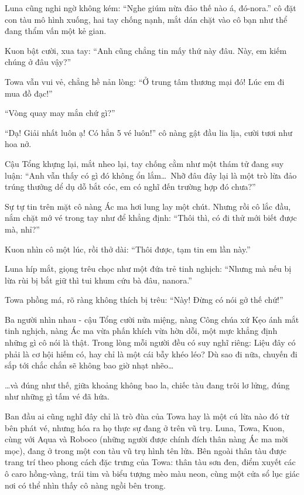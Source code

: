 \documentclass[../main.tex]{subfiles}
\begin{document}
Luna cũng nghi ngờ không kém: ``Nghe giúm nừa đảo thế nào á, đó-nora.'' cô đặt con tàu mô hình xuống, hai tay chống nạnh, mắt dán chặt vào cô bạn như thể đang thẩm vấn một kẻ gian.

Kuon bật cười, xua tay: ``Anh cũng chẳng tin mấy thứ này đâu. Này, em kiếm chúng ở đâu vậy?''

Towa vẫn vui vẻ, chẳng hề nản lòng: ``Ở trung tâm thương mại đó! Lúc em đi mua đồ đạc!''

``Vòng quay may mắn chứ gì?''

``Dạ! Giải nhất luôn ạ! Có hẳn 5 vé luôn!'' cô nàng gật đầu lia lịa, cười tươi như hoa nở.

Cậu Tổng khựng lại, mắt nheo lại, tay chống cằm như một thám tử đang suy luận: ``Anh vẫn thấy có gì đó không ổn lắm\dots\ Nhỡ đâu đây lại là một trò lừa đảo trúng thưởng dể dụ dỗ bắt cóc, em có nghĩ đến trường hợp đó chưa?''

Sự tự tin trên mặt cô nàng Ác ma hơi lung lay một chút. Nhưng rồi cô lắc đầu, nắm chặt mớ vé trong tay như để khẳng định: ``Thôi thì, có đi thử mới biết được mà, nhỉ?''

Kuon nhìn cô một lúc, rồi thở dài: ``Thôi được, tạm tin em lần này.''

Luna híp mắt, giọng trêu chọc như một đứa trẻ tinh nghịch: ``Nhưng mà nếu bị lừa rùi bị bắt giữ thì tui khum cứu bà đâu, nanora.''

Towa phồng má, rõ ràng không thích bị trêu: ``Này! Đừng có nói gở thế chứ!''

Ba người nhìn nhau - cậu Tổng cười nửa miệng, nàng Công chúa xứ Kẹo ánh mắt tinh nghịch, nàng Ác ma vừa phấn khích vừa hờn dỗi, một mực khẳng định những gì cô nói là thật. Trong lòng mỗi người đều có suy nghĩ riêng: Liệu đây có phải là cơ hội hiếm có, hay chỉ là một cái bẫy khéo léo? Dù sao đi nữa, chuyến đi sắp tới chắc chắn sẽ không bao giờ nhạt nhẽo\dots

\ct

\dots và đúng như thế, giữa khoảng không bao la, chiếc tàu đang trôi lơ lửng, đúng như những gì tấm vé đã hứa.

Ban đầu ai cũng nghĩ đây chỉ là trò đùa của Towa hay là một cú lừa nào đó từ bên phát vé, nhưng hóa ra họ thực sự đang ở trên vũ trụ. Luna, Towa, Kuon, cùng với Aqua và Roboco (những người được chính đích thân nàng Ác ma mời mọc), đang ở trong một con tàu vũ trụ hình tên lửa. Bên ngoài thân tàu được trang trí theo phong cách đặc trưng của Towa: thân tàu sơn đen, điểm xuyết các ô caro hồng-vàng, trái tim và biểu tượng mèo màu neon, cùng một cửa sổ lục giác nơi có thể nhìn thấy cô nàng ngồi bên trong.
\end{document}
